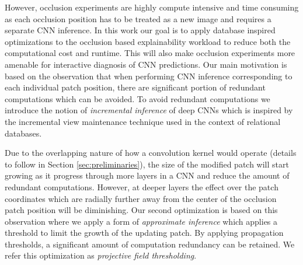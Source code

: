 
However, occlusion experiments are highly compute intensive and time consuming as each occlusion position has to be treated as a new image and requires a separate CNN inference.
In this work our goal is to apply database inspired optimizations to the occlusion based explainability workload to reduce both the computational cost and runtime.
This will also make occlusion experiments more amenable for interactive diagnosis of CNN predictions.
Our main motivation is based on the observation that when performing CNN inference corresponding to each individual patch position, there are significant portion of redundant computations which can be avoided.
To avoid redundant computations we introduce the notion of \textit{incremental inference} of deep CNNs which is inspired by the incremental view maintenance technique used in the context of relational databases.

Due to the overlapping nature of how a convolution kernel would operate (details to follow in Section \ref{sec:preliminaries}), the size of the modified patch will start growing as it progress through more layers in a CNN and reduce the amount of redundant computations.
However, at deeper layers the effect over the patch coordinates which are radially further away from the center of the occlusion patch position will be diminishing.
Our second optimization is based on this observation where we apply a form of \textit{approximate inference} which applies a threshold to limit the growth of the updating patch. 
By applying propagation thresholds, a significant amount of computation redundancy can be retained.
We refer this optimization as \textit{projective field thresholding}.

